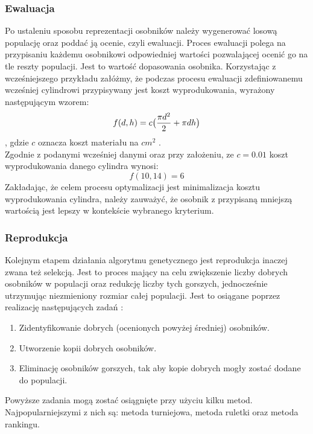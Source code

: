 \documentclass[twoside]{iisthesis}
\begin{document}
\subsubsection{Ewaluacja}
Po ustaleniu sposobu reprezentacji osobników należy wygenerować losową populację oraz poddać ją ocenie, czyli ewaluacji. Proces ewaluacji polega na przypisaniu każdemu osobnikowi odpowiedniej wartości pozwalającej ocenić go na tle reszty populacji. Jest to wartość dopasowania osobnika. Korzystając z wcześniejszego przykładu załóżmy, że podczas procesu ewaluacji zdefiniowanemu wcześniej cylindrowi przypisywany jest koszt wyprodukowania, wyrażony następującym wzorem:
\begin{equation}
f(d,h) = c\big{(}\dfrac{\pi d^{2}}{2} + \pi dh\big{)}
\end{equation}
, gdzie $c$ oznacza koszt materiału na $cm^{2}$ \cite{book}.\\
Zgodnie z podanymi wcześniej danymi oraz przy założeniu, ze $c = 0.01$ koszt wyprodukowania danego cylindra wynosi:
\[f(10, 14) = 6\]
Zakładając, że celem procesu optymalizacji jest minimalizacja kosztu wyprodukowania cylindra, należy zauważyć, że osobnik z przypisaną mniejszą wartością jest lepszy w kontekście wybranego kryterium.
\subsubsection{Reprodukcja}
Kolejnym etapem działania algorytmu genetycznego jest reprodukcja inaczej zwana też selekcją. Jest to proces mający na celu zwiększenie liczby dobrych osobników w populacji oraz redukcję liczby tych gorszych, jednocześnie utrzymując niezmieniony rozmiar całej populacji. Jest to osiągane poprzez realizację następujących zadań \cite{book}:\\
\begin{enumerate}
	\item Zidentyfikowanie dobrych (ocenionych powyżej średniej) osobników.
	\item Utworzenie kopii dobrych osobników.
	\item Eliminację osobników gorszych, tak aby kopie dobrych mogły zostać dodane do populacji.\\
\end{enumerate}
Powyższe zadania mogą zostać osiągnięte przy użyciu kilku metod. Najpopularniejszymi z nich są: metoda turniejowa, metoda ruletki oraz metoda rankingu.
\end{document}

